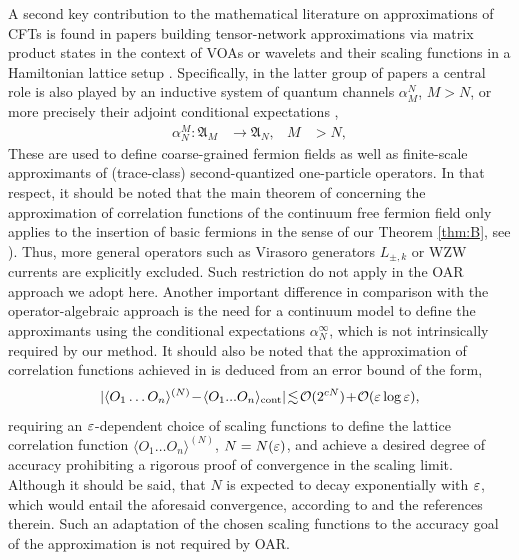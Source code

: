 \documentclass[a4paper, 11pt]{article}
\newcommand{\fA}{\mathfrak{A}}\newcommand{\cA}{\mathcal{A}}\newcommand{\dA}{\mathds{A}}\newcommand{\sA}{\mathscr{A}}
\DeclareMathOperator{\1}{\mathds{1}}
\begin{document}
\bigskip

A second key contribution to the mathematical literature on approximations of CFTs is found in papers building tensor-network approximations via matrix product states \cite{KoenigMatrixProductApproximations1, KoenigMatrixProductApproximations2} in the context of VOAs or wavelets and their scaling functions in a Hamiltonian lattice setup \cite{EvenblyEntanglementRenormalizationAnd, HaegemanRigorousFreeFermion, WitteveenQuantumCircuitApproximations}. Specifically, in the latter group of papers a central role is also played by an inductive system of quantum channels $\alpha^{N}_{M}$, $M>N$, or more precisely their adjoint conditional expectations \cite{EvansCompletelyPositiveQuasi},
\begin{align*}
\alpha^{M}_{N} : \fA_{M} & \longrightarrow \fA_{N}, & M & >N,
\end{align*}
These are used to define coarse-grained fermion fields as well as finite-scale approximants of (trace-class) second-quantized one-particle operators. In that respect, it should be noted that the main theorem of \cite{WitteveenQuantumCircuitApproximations} concerning the approximation of correlation functions of the continuum free fermion field only applies to the insertion of basic fermions in the sense of our Theorem \ref{thm:B}, see \cite[Theorem 4.4, p.~31]{WitteveenQuantumCircuitApproximations}). Thus, more general operators such as Virasoro generators $L_{\pm,k}$ or WZW currents are explicitly excluded. Such restriction do not apply in the OAR approach we adopt here. Another important difference in comparison with the operator-algebraic approach is the need for a continuum model to define the approximants using the conditional expectations $\alpha^{\infty}_{N}$, which is not intrinsically required by our method. It should also be noted that the approximation of correlation functions achieved in \cite{HaegemanRigorousFreeFermion, WitteveenQuantumCircuitApproximations} is deduced from an error bound of the form,
\begin{align*}
|\langle O_{1}\ldots O_{n}\rangle^{(N)}\!-\!\langle O_{1}...O_{n}\rangle_{\text{cont}}|\!\lesssim\!\mathcal{O}(2^{c N})\!+\!\mathcal{O}(\varepsilon\log\varepsilon),
\end{align*}
requiring an $\varepsilon$-dependent choice of scaling functions to define the lattice correlation function $\langle O_{1}\dots O_{n}\rangle^{(N)}$, $N = N(\varepsilon)$, and achieve a desired degree of accuracy prohibiting a rigorous proof of convergence in the scaling limit. Although it should be said, that $N$ is expected to decay exponentially with $\varepsilon$, which would entail the aforesaid convergence, according to \cite{WitteveenQuantumCircuitApproximations} and the references therein. Such an adaptation of the chosen scaling functions to the accuracy goal of the approximation is not required by OAR.\\
\end{document}
